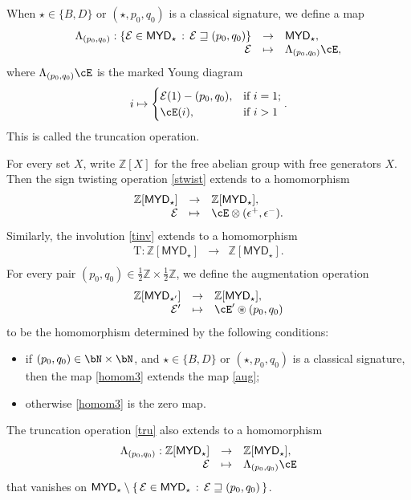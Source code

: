 \documentclass[11pt,a4paper]{amsart}
\def\MYD{{\mathsf{MYD}}}
\newcommand{\CE}{{\mathcal {E}}}
\newcommand{\Z}{\mathbb{Z}}
\newcommand{\be}{\begin {equation}}
\newcommand{\ee}{\end {equation}}
\numberwithin{equation}{section}
\theoremstyle{remark}
\def\MYD{{\mathsf{MYD}}}
\def\lotimes{\otimes}
\begin{document}
 When $\star\in \{B,D\}$ or
$ (\star,p_{0},q_{0})$ is a classical signature, we define a map
\be\label{tru}
 \begin{array}{rcl}
 \Lambda_{(p_0,q_0)}: \{\CE\in \MYD_{\star}\,:\,\CE\sqsupseteq (p_{0},q_{0})\} &\rightarrow & \MYD_{\star},\\
  \CE&\mapsto & \Lambda_{(p_0,q_0)}\cE,
  \end{array}
\ee
where $\Lambda_{(p_0,q_0)}\cE$ is the marked Young diagram
\[
i\mapsto \begin{cases}
    \CE(1)-(p_{0},q_{0}), & \text{if } i=1;\\
    \cE(i), & \text{if } i>1
  \end{cases}.
  \]
This is called the truncation operation.


For every set $X$, write $\Z[X]$ for the free abelian group with free generators $X$. Then the sign twisting operation \eqref{stwist}
extends to a homomorphism
\be\label{homom1}
\begin{array}{rcl}
  \Z[\MYD_{\star}]&\rightarrow&\Z[\MYD_{\star}], \\
   \CE&\mapsto &\cE \lotimes(\epsilon^{+},\epsilon^{-}).
   \end{array}
\ee
Similarly, the involution
\eqref{tinv} extends to a homomorphism
\be\label{homom2}
\begin{array}{rcl}
\mathrm T:   \Z[\MYD_{\star}]&\rightarrow&\Z[\MYD_{\star}]. \\
   \end{array}
\ee
For every pair $(p_0,q_0)\in \frac{1}{2}\Z\times \frac{1}{2}\Z$, we define the augmentation operation
\be\label{homom3}
\begin{array}{rcl}
  \Z[\MYD_{\star'}]&\rightarrow&\Z[\MYD_{\star}], \\
   \CE'&\mapsto &\cE' \circledast (p_0,q_0)
   \end{array}
\ee
to be the homomorphism determined by the following conditions:
\begin{itemize}
    \item if $(p_{0},q_{0})\in \bN\times \bN$, and $\star\in \{B,D\}$ or
$ (\star,p_{0},q_{0})$ is a classical signature, then the map \eqref{homom3} extends the map \eqref{aug};
\item
otherwise  \eqref{homom3} is the zero map.
\end{itemize}
The truncation operation \eqref{tru} also
extends to a  homomorphism
\be\label{homom4}
 \begin{array}{rcl}
 \Lambda_{(p_0,q_0)}: \Z[\MYD_{\star}] &\rightarrow & \Z[\MYD_{\star}],\\
  \CE&\mapsto & \Lambda_{(p_0,q_0)}\cE
  \end{array}
\ee
that  vanishes on $\MYD_\star\setminus \set{\CE\in \MYD_{\star}\,:\,\CE\sqsupseteq (p_{0},q_{0})}$.
\end{document}
